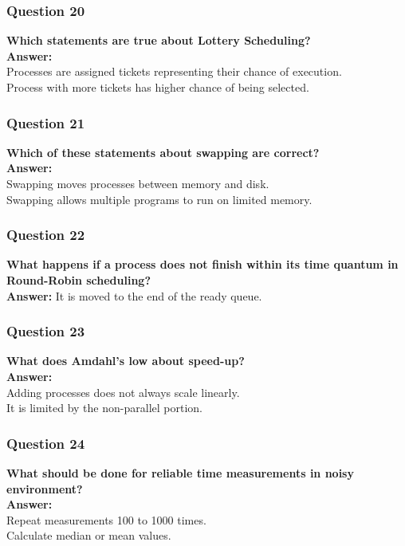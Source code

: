 \documentclass{article}
\begin{document}
\subsubsection*{Question 20}
\textbf{Which statements are true about Lottery Scheduling?} \\
\textbf{Answer:} \\
Processes are assigned tickets representing their chance of execution. \\
Process with more tickets has higher chance of being selected.

\subsubsection*{Question 21}
\textbf{Which of these statements about swapping are correct?} \\
\textbf{Answer:} \\
Swapping moves processes between memory and disk. \\
Swapping allows multiple programs to run on limited memory.

\subsubsection*{Question 22}
\textbf{What happens if a process does not finish within its time quantum in Round-Robin scheduling?} \\
\textbf{Answer:} It is moved to the end of the ready queue.

\subsubsection*{Question 23}
\textbf{What does Amdahl's low about speed-up?} \\
\textbf{Answer:} \\ 
Adding processes does not always scale linearly. \\
It is limited by the non-parallel portion.

\subsubsection*{Question 24} 
\textbf{What should be done for reliable time measurements in noisy environment?} \\
\textbf{Answer:} \\
Repeat measurements 100 to 1000 times. \\
Calculate median or mean values.
\end{document}
